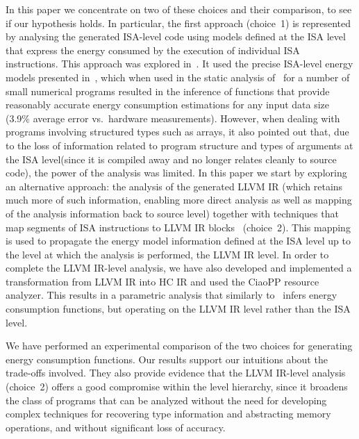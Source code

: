 \documentclass{llncs}
\newcommand{\level}{level\xspace}
\newcommand{\hcir}{HC IR\xspace}
\newcommand{\llvmir}{LLVM IR\xspace}
\newcommand{\ciaopp}{CiaoPP\xspace}
\begin{document}
In this paper
we concentrate on two of these choices and their comparison, to see if
our hypothesis holds.
In particular, the first approach (choice~1) is represented by
analysing the generated ISA-\level code using 
models defined at the ISA \level that express the energy consumed by
the execution of individual ISA instructions.
This approach was explored
in~\cite{isa-energy-lopstr13-final}.  It used the precise ISA-\level
energy models presented in~\cite{Kerrison13}, which when used in the
static analysis of~\cite{isa-energy-lopstr13-final} for a number of
small numerical programs resulted in the inference of functions that provide
reasonably accurate energy consumption estimations for any input data
size (3.9\% average error vs.\ hardware measurements).
However, when dealing with programs involving structured types such as arrays, it
also pointed out
that, due to the loss of information related to program structure and
types of arguments at the ISA \level (since it is compiled away and no
longer relates cleanly to source code), the power of the analysis was
limited.
In this paper we start by exploring an alternative approach: the
analysis of the generated \llvmir
(which retains much more of such information, enabling more direct
analysis as well as mapping of the analysis information back to source
\level)
together with techniques that map segments of ISA instructions to \llvmir
blocks~\cite{Georgiou2015arXiv} (choice~2). This mapping is used to propagate
the energy model information defined at the ISA \level up to the
\level at which the analysis is performed, the \llvmir \level.  In
order to complete the \llvmir-\level analysis, we have also developed
and implemented a transformation from \llvmir into \hcir 
and used the \ciaopp resource analyzer. This results in a parametric
analysis that similarly to~\cite{isa-energy-lopstr13-final} infers
energy consumption functions, but operating on the \llvmir \level
rather than the ISA \level.  

We have performed an experimental comparison of the two choices
for generating energy consumption functions. Our results support
our intuitions about the trade-offs involved. They also provide
evidence that the \llvmir-\level analysis (choice~2) offers a good
compromise within the \level hierarchy, since it broadens the class of
programs that can be analyzed 
without the need for developing complex techniques for recovering type
information and abstracting memory operations, and
without significant loss of accuracy.
\end{document}
